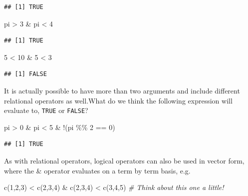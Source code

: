\documentclass[
]{book}
\newenvironment{Shaded}{\begin{snugshade}}{\end{snugshade}}
\newcommand{\CommentTok}[1]{\textcolor[rgb]{0.56,0.35,0.01}{\textit{#1}}}
\newcommand{\DecValTok}[1]{\textcolor[rgb]{0.00,0.00,0.81}{#1}}
\newcommand{\FunctionTok}[1]{\textcolor[rgb]{0.00,0.00,0.00}{#1}}
\newcommand{\NormalTok}[1]{#1}
\newcommand{\SpecialCharTok}[1]{\textcolor[rgb]{0.00,0.00,0.00}{#1}}
\theoremstyle{definition}
\theoremstyle{definition}
\theoremstyle{definition}
\theoremstyle{definition}
\theoremstyle{remark}
\begin{document}
\begin{verbatim}
## [1] TRUE
\end{verbatim}

\begin{Shaded}
\begin{Highlighting}[]
\NormalTok{pi }\SpecialCharTok{\textgreater{}} \DecValTok{3} \SpecialCharTok{\&}\NormalTok{ pi }\SpecialCharTok{\textless{}} \DecValTok{4}
\end{Highlighting}
\end{Shaded}

\begin{verbatim}
## [1] TRUE
\end{verbatim}

\begin{Shaded}
\begin{Highlighting}[]
\DecValTok{5} \SpecialCharTok{\textless{}} \DecValTok{10} \SpecialCharTok{\&} \DecValTok{5} \SpecialCharTok{\textless{}} \DecValTok{3}
\end{Highlighting}
\end{Shaded}

\begin{verbatim}
## [1] FALSE
\end{verbatim}

It is actually possible to have more than two arguments and include different relational operators as well.What do we think the following expression will evaluate to, \texttt{TRUE} or \texttt{FALSE}?

\begin{Shaded}
\begin{Highlighting}[]
\NormalTok{pi }\SpecialCharTok{\textgreater{}} \DecValTok{0} \SpecialCharTok{\&}\NormalTok{ pi }\SpecialCharTok{\textless{}} \DecValTok{5} \SpecialCharTok{\&} \SpecialCharTok{!}\NormalTok{(pi }\SpecialCharTok{\%\%} \DecValTok{2} \SpecialCharTok{==} \DecValTok{0}\NormalTok{)}
\end{Highlighting}
\end{Shaded}

\begin{verbatim}
## [1] TRUE
\end{verbatim}

As with relational operators, logical operators can also be used in vector form, where the \& operator evaluates on a term by term basis, e.g.

\begin{Shaded}
\begin{Highlighting}[]
\FunctionTok{c}\NormalTok{(}\DecValTok{1}\NormalTok{,}\DecValTok{2}\NormalTok{,}\DecValTok{3}\NormalTok{) }\SpecialCharTok{\textless{}} \FunctionTok{c}\NormalTok{(}\DecValTok{2}\NormalTok{,}\DecValTok{3}\NormalTok{,}\DecValTok{4}\NormalTok{) }\SpecialCharTok{\&} \FunctionTok{c}\NormalTok{(}\DecValTok{2}\NormalTok{,}\DecValTok{3}\NormalTok{,}\DecValTok{4}\NormalTok{) }\SpecialCharTok{\textless{}} \FunctionTok{c}\NormalTok{(}\DecValTok{3}\NormalTok{,}\DecValTok{4}\NormalTok{,}\DecValTok{5}\NormalTok{) }\CommentTok{\# Think about this one a little!}
\end{Highlighting}
\end{Shaded}
\end{document}
